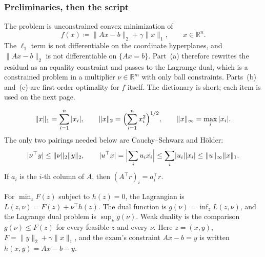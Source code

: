 \setcounter{section}{7}
\setcounter{theorem}{0}
\setcounter{definition}{0}
\setcounter{remark}{0}
\setcounter{note}{0}

\subsubsection{Preliminaries, then the script}

The problem is unconstrained convex minimization of
\begin{equation}
\label{eq:p7-primal}
f(x)
\coloneqq
\|Ax-b\|_{2}+\gamma\|x\|_{1},
\qquad
x\in\mathbb{R}^{n}.
\end{equation}
The \(\ell_1\) term is not differentiable on the coordinate hyperplanes, and \(\|Ax-b\|_{2}\) is not differentiable on \(\{Ax=b\}\). Part~(a) therefore rewrites the residual as an equality constraint and passes to the Lagrange dual, which is a constrained problem in a multiplier \(\nu\in\mathbb{R}^{m}\) with only ball constraints. Parts~(b) and~(c) are first-order optimality for \(f\) itself. The dictionary is short; each item is used on the next page.

\begin{definition}
\label{def:p7-lp}
\[
\|x\|_{1}=\sum_{i=1}^{n}|x_{i}|,
\qquad
\|x\|_{2}=\Bigl(\sum_{i=1}^{n}x_{i}^{2}\Bigr)^{1/2},
\qquad
\|x\|_{\infty}=\max_{i}|x_{i}|.
\]
The only two pairings needed below are Cauchy--Schwarz and H\"older:
\begin{equation}
\label{eq:p7-holder}
\lvert\nu^{\top}y\rvert\le\|\nu\|_{2}\|y\|_{2},
\qquad
\lvert u^{\top}x\rvert
=
\Bigl\lvert\sum_{i}u_{i}x_{i}\Bigr\rvert
\le
\sum_{i}\lvert u_{i}\rvert\lvert x_{i}\rvert
\le
\|u\|_{\infty}\|x\|_{1}.
\end{equation}
If \(a_{i}\) is the \(i\)-th column of \(A\), then \((A^{\top}r)_{i}=a_{i}^{\top}r\).
\end{definition}

\begin{definition}
\label{def:p7-dual}
For \(\min_{z}F(z)\) subject to \(h(z)=0\), the Lagrangian is \(L(z,\nu)=F(z)+\nu^{\top}h(z)\). The dual function is \(g(\nu)=\inf_{z}L(z,\nu)\), and the Lagrange dual problem is \(\sup_{\nu}g(\nu)\). Weak duality is the comparison \(g(\nu)\le F(z)\) for every feasible \(z\) and every \(\nu\). Here \(z=(x,y)\), \(F=\|y\|_{2}+\gamma\|x\|_{1}\), and the exam's constraint \(Ax-b=y\) is written \(h(x,y)=Ax-b-y\).
\end{definition}

